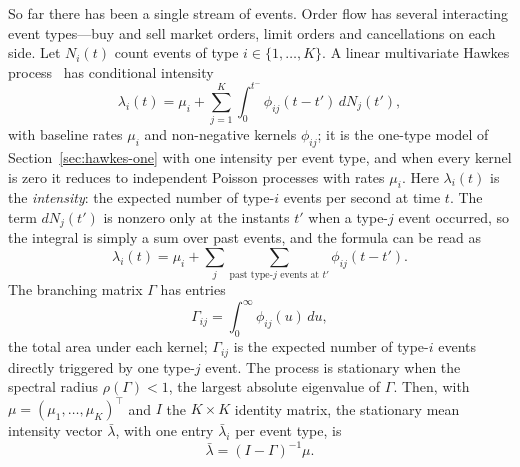 So far there has been a single stream of events. Order flow has several interacting event types---buy and sell market orders, limit orders and
cancellations on each side. Let $N_i(t)$ count events of type $i \in \{1,\dots,K\}$. A linear multivariate Hawkes
process~\citep{hawkes1971} has conditional intensity
\begin{equation}
  \lambda_i(t) = \mu_i + \sum_{j=1}^{K} \int_0^{t^-} \phi_{ij}(t-t')\, dN_j(t'),
\end{equation}
with baseline rates $\mu_i$ and non-negative kernels $\phi_{ij}$; it is the one-type model of
Section~\ref{sec:hawkes-one} with one intensity per event type, and when every kernel is zero it reduces to
independent Poisson processes with rates $\mu_i$. Here $\lambda_i(t)$ is the
\emph{intensity}: the expected number of type-$i$ events per second at time $t$. The term
$dN_j(t')$ is nonzero only at the instants $t'$ when a type-$j$ event occurred, so the integral is
simply a sum over past events, and the formula can be read as
\[
  \lambda_i(t) = \mu_i + \sum_j \sum_{\text{past type-}j\text{ events at } t'} \phi_{ij}(t - t').
\]
The branching matrix $\Gamma$ has entries
\[
  \Gamma_{ij} = \int_0^\infty \phi_{ij}(u)\,du ,
\]
the total area under each kernel; $\Gamma_{ij}$ is the expected number of type-$i$ events directly triggered by one type-$j$ event.
The process is stationary when the spectral radius
$\rho(\Gamma) < 1$, the largest absolute eigenvalue of $\Gamma$. Then, with
$\mu = (\mu_1, \dots, \mu_K)^\top$ and $I$ the $K \times K$ identity matrix, the stationary mean
intensity vector $\bar\lambda$, with one entry $\bar\lambda_i$ per event type, is
\begin{equation}
  \bar\lambda = (I - \Gamma)^{-1}\mu .
\end{equation}


